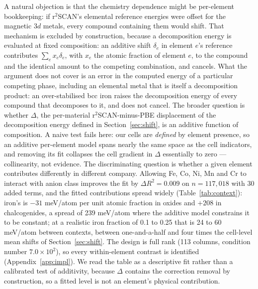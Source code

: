 \documentclass[11pt]{article}
\begin{document}
A natural objection is that the chemistry dependence might be per-element
bookkeeping: if r$^2$SCAN's elemental reference energies were offset for the magnetic
3$d$ metals, every compound containing them would shift. That mechanism is excluded by
construction, because a decomposition energy is evaluated at fixed composition: an
additive shift $\delta_e$ in element $e$'s reference contributes $\sum_e x_e \delta_e$,
with $x_e$ the atomic fraction of element $e$, to
the compound and the identical amount to the competing combination, and cancels. What the
argument does not cover is an error in the computed energy of a particular competing
phase, including an elemental metal that is itself a decomposition product: an
over-stabilised bcc iron raises the decomposition energy of every compound that decomposes
to it, and does not cancel. The broader question is whether $\Delta$, the per-material r$^2$SCAN-minus-PBE
displacement of the decomposition energy defined in Section~\ref{sec:shift}, is an
additive function of composition.
A naive test fails here: our cells are \emph{defined} by element presence, so an additive
per-element model spans nearly the same space as the cell indicators, and removing its fit
collapses the cell gradient in $\Delta$ essentially to zero --- collinearity, not
evidence.
The discriminating question is whether a given element contributes differently
in different company. Allowing Fe, Co, Ni, Mn and Cr to interact with anion class
improves the fit by $\Delta R^2 = 0.009$ on $n=117{,}018$ with 30 added terms, and the
fitted contributions spread widely (Table~\ref{tab:context}): iron's is $-31$ meV/atom per
unit atomic fraction in oxides and $+208$ in chalcogenides, a spread of 239 meV/atom
where the additive model constrains it to be constant; at a realistic iron fraction of
0.1 to 0.25 that is 24 to 60 meV/atom between contexts, between one-and-a-half and four times the cell-level
mean shifts of Section~\ref{sec:shift}. The design is full rank (113 columns, condition
number $7.0\times10^{2}$), so every within-element contrast is identified
(Appendix~\ref{app:impl}). We read the table as a descriptive fit rather than a
calibrated test of additivity, because $\Delta$ contains the correction removal by
construction, so a fitted level is not an element's physical contribution.
\end{document}
